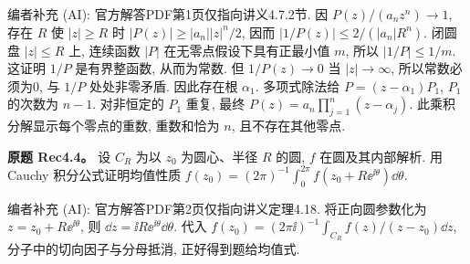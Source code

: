 \begin{solution}
编者补充 (AI): 官方解答PDF第1页仅指向讲义4.7.2节. 因 $P(z)/(a_nz^n)\to1$, 存在 $R$ 使 $|z|\ge R$ 时 $|P(z)|\ge|a_n||z|^n/2$, 因而 $|1/P(z)|\le2/(|a_n|R^n)$. 闭圆盘 $|z|\le R$ 上, 连续函数 $|P|$ 在无零点假设下具有正最小值 $m$, 所以 $|1/P|\le1/m$. 这证明 $1/P$ 是有界整函数, 从而为常数. 但 $1/P(z)\to0$ 当 $|z|\to\infty$, 所以常数必须为0, 与 $1/P$ 处处非零矛盾. 因此存在根 $\alpha_1$. 多项式除法给 $P=(z-\alpha_1)P_1$, $P_1$ 的次数为 $n-1$. 对非恒定的 $P_1$ 重复, 最终 $P(z)=a_n\prod_{j=1}^n(z-\alpha_j)$. 此乘积分解显示每个零点的重数, 重数和恰为 $n$, 且不存在其他零点.
\end{solution}
\begin{exercise}
\textbf{原题 Rec4.4。}\label{ass:rec4-4}
设 $C_R$ 为以 $z_0$ 为圆心、半径 $R$ 的圆, $f$ 在圆及其内部解析. 用 Cauchy 积分公式证明均值性质 $f(z_0)=(2\pi)^{-1}\int_0^{2\pi}f(z_0+R\ee^{\ii\theta})\dd\theta$.
\end{exercise}
\begin{solution}
编者补充 (AI): 官方解答PDF第2页仅指向讲义定理4.18. 将正向圆参数化为 $z=z_0+R\ee^{\ii\theta}$, 则 $\dd z=\ii R\ee^{\ii\theta}\dd\theta$. 代入 $f(z_0)=(2\pi\ii)^{-1}\int_{C_R}f(z)/(z-z_0)\dd z$, 分子中的切向因子与分母抵消, 正好得到题给均值式.
\end{solution}

